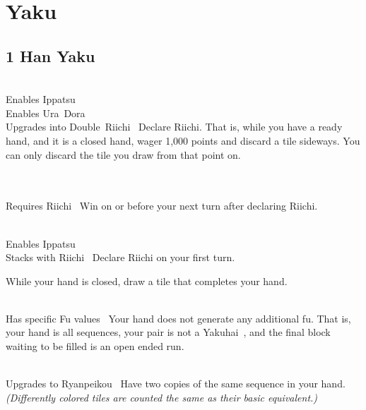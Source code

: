 \section{Yaku}\label{core:sec:yaku}

\subsection{1 Han Yaku}\label{core:ssec:1-han-yaku}

	{\closedhand \\ 
	\upgradesto Enables Ippatsu~ \\ 
	\upgradestoother Enables Ura~Dora~ \\ 
	\upgradesto Upgrades into Double~Riichi~}
	{Declare Riichi. That is, while you have a ready hand, and it is a closed hand, wager 1,000 points and discard a tile sideways. You can only discard the tile you draw from that point on.}

	{\closedhand \\ 
	\brokenhand \\
	\upgradesfrom Requires Riichi~}
	{Win on or before your next turn after declaring Riichi.}

	{\closedhand \\ 
	\upgradesto Enables Ippatsu~ \\ 
	\upgradesfrom Stacks with Riichi~}
	{Declare Riichi on your first turn.}

	{\closedhand}
	{While your hand is closed, draw a tile that completes your hand.}

	{\closedhand \\
	\upgradestoother Has specific Fu values~}
	{Your hand does not generate any additional fu. That is, your hand is all sequences, your pair is not a Yakuhai~, and the final block waiting to be filled is an open ended run.}

	{\closedhand \\
	\upgradesto Upgrades to Ryanpeikou~}
	{Have two copies of the same sequence in your hand. \textit{(Differently colored tiles are counted the same as their basic equivalent.)}}

